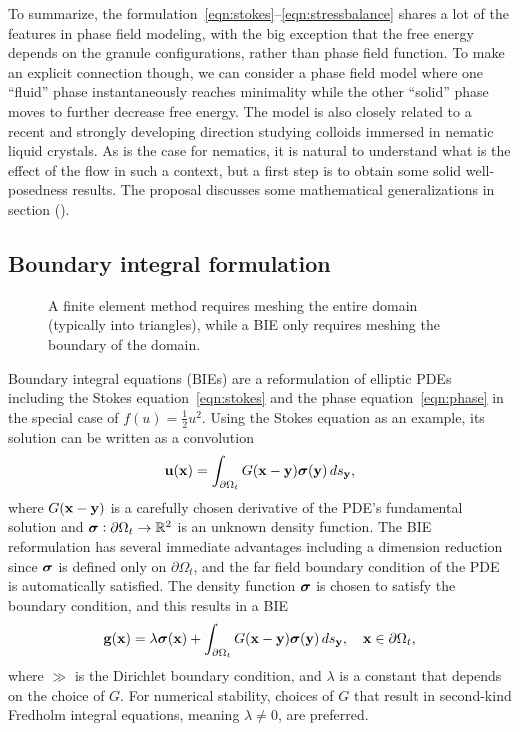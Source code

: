 To summarize, the
formulation~\eqref{eqn:stokes}--\eqref{eqn:stressbalance} shares a lot
of the features in phase field modeling, with the big exception that the
free energy depends on the granule configurations, rather than phase field
function. To make an explicit connection though, we can consider a phase
field model where one ``fluid'' phase instantaneously reaches minimality
while the other ``solid'' phase moves to further decrease free energy.
The model is also closely related to a recent and strongly developing
direction studying colloids immersed in nematic liquid crystals. As is
the case for nematics, it is natural to understand what is the effect of
the flow in such a context, but a first step is to obtain some solid
well-posedness results. The proposal discusses some mathematical
generalizations in section ().

\subsection{Boundary integral formulation}
\label{sec:bie}

\begin{figure}
  \caption{\label{fig:fem_vs_bie} \footnotesize A finite element method
  requires meshing the entire domain (typically into triangles), while a
  BIE only requires meshing the boundary of the domain.}
\end{figure}
Boundary integral equations (BIEs) are a reformulation of elliptic PDEs
including the Stokes equation~\eqref{eqn:stokes} and the phase
equation~\eqref{eqn:phase} in the special case of $f(u) =
\tfrac{1}{2}u^2$. Using the Stokes equation as an example, its solution
can be written as a convolution 
\begin{align*}
  \mathbf{u}(\mathbf{x}) = \int_{\partial\Omega_t} G(\mathbf{x} - \mathbf{y}) \boldsymbol{\sigma}(\mathbf{y}) \, ds_{\mathbf{y}},
\end{align*}
where $G(\mathbf{x} - \mathbf{y})$ is a carefully chosen derivative of the PDE's
fundamental solution and $\boldsymbol{\sigma}: \partial \Omega_t \rightarrow \mathbb{R}^2$
is an unknown density function. The BIE reformulation has several
immediate advantages including a dimension reduction since $\boldsymbol{\sigma}$ is
defined only on $\partial \Omega_t$, and the far field boundary
condition of the PDE is automatically satisfied. The density
function $\boldsymbol{\sigma}$ is chosen to satisfy the boundary condition, and this
results in a BIE 
\begin{align*}
  \mathbf{g}(\mathbf{x}) = \lambda \boldsymbol{\sigma}(\mathbf{x}) + 
    \int_{\partial\Omega_t} G(\mathbf{x} - \mathbf{y}) \boldsymbol{\sigma}(\mathbf{y}) \, ds_{\mathbf{y}},
    \quad \mathbf{x} \in \partial\Omega_t,
\end{align*}
where $\gg$ is the Dirichlet boundary condition, and $\lambda$ is a
constant that depends on the choice of $G$. For numerical stability,
choices of $G$ that result in second-kind Fredholm integral equations,
meaning $\lambda \neq 0$, are preferred.

